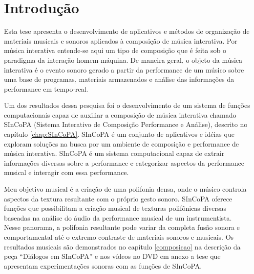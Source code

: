\documentclass{ppgmus}
\begin{document}
\tableofcontents
{}

\listoffigures

\mainmatter




\chapter{Introdução}
\label{sec:intro}


Esta tese apresenta o desenvolvimento de aplicativos e métodos
de organização de materiais musicais e sonoros aplicados à composição
de música interativa. Por música interativa entende-se aqui um tipo
de composição que é feita sob o paradigma da interação homem-máquina.
De maneira geral, o objeto da música interativa é o evento sonoro gerado a partir da
performance de um músico sobre uma base de programas, materiais
armazenados e análise das informações da performance em tempo-real.


 Um dos resultados dessa pesquisa foi o desenvolvimento de um sistema de funções computacionais capaz
de auxiliar a composição de música interativa chamado SInCoPA (Sistema Interativo
de Composição Performance e Análise), descrito no capítulo \ref{chap:SInCoPA}.
 SInCoPA é um conjunto de aplicativos e idéias que exploram soluções
na busca por um ambiente de composição e
performance de música interativa. SInCoPA
 é um sistema computacional capaz de extrair informações diversas sobre a performance e
categorizar aspectos da performance musical e interagir com essa performance.


Meu objetivo musical é a criação de uma polifonia densa, onde o músico controla
aspectos da textura resultante com o próprio gesto sonoro. 
SInCoPA oferece funções que possibilitam a criação musical de texturas polifônicas
diversas baseadas na análise do áudio da performance musical de um instrumentista.
Nesse panorama, a
polifonia resultante pode variar da completa fusão sonora e comportamental até o extremo
contraste de materiais sonoros e musicais. Os resultados musicais são demonstrados no
capítulo \ref{composicao} na descrição da peça ``Diálogos em SInCoPA'' e nos vídeos no
DVD em anexo a tese que apresentam experimentações sonoras com as funções de SInCoPA.
\end{document}
